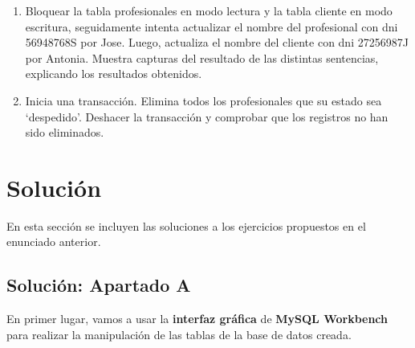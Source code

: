 \begin{enumerate}
    \item Bloquear la tabla profesionales en modo lectura y la tabla cliente en modo escritura, seguidamente intenta actualizar el nombre del profesional con dni 56948768S por Jose. Luego, actualiza el nombre del cliente con dni 27256987J por Antonia. Muestra capturas del resultado de las distintas sentencias, explicando los resultados obtenidos.

    \item Inicia una transacción. Elimina todos los profesionales que su estado sea ‘despedido’. Deshacer la transacción y comprobar que los registros no han sido eliminados.
\end{enumerate}

\section{Solución}
En esta sección se incluyen las soluciones a los ejercicios propuestos en el enunciado anterior.

\subsection{Solución: Apartado A}
En primer lugar, vamos a usar la \textbf{interfaz gráfica} de \textbf{MySQL Workbench} para realizar la manipulación de las tablas de la base de datos creada.


